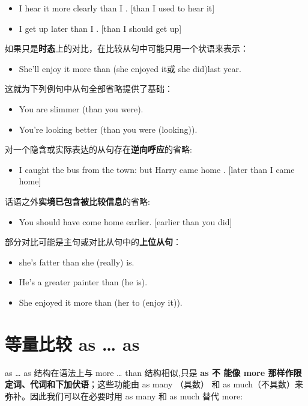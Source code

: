 \begin{itemize}
\item I hear it more clearly than I . [than I used to hear it]

\item I get up later than I . [than I should get up]
\end{itemize}

如果只是\textbf{时态}上的对比，在比较从句中可能只用一个状语来表示：
\begin{itemize}
\item She'll enjoy it more than (she enjoyed it或 she did)last year.
\end{itemize}
这就为下列例句中从句全部省略提供了基础：
\begin{itemize}
\item You are slimmer (than you were).
\item You're looking better (than you were (looking)).
\end{itemize}

对一个隐含或实际表达的从句存在\textbf{逆向呼应}的省略:
\begin{itemize}
\item I caught the bus from the town: but Harry came home . [later than I came home]
\end{itemize}


话语之外\textbf{实境已包含被比较信息}的省略:
\begin{itemize}
\item You should have come home earlier. [earlier than you did]
\end{itemize}

部分对比可能是主句或对比从句中的\textbf{上位从句}：
\begin{itemize}
\item {} she's fatter than she (really) is.
\item He's a greater painter than  (he is).
\item She enjoyed it more than  (her to (enjoy it)).
\end{itemize}

\section{等量比较 as \ldots{} as}

as \ldots{} as 结构在语法上与 more \ldots{} than 结构相似,只是 \textbf{as 不
  能像 more 那样作限定词、代词和下加伏语}；这些功能由 as many （具数） 和 as
much（不具数）来弥补。因此我们可以在必要时用 as many 和 as much 替代 more:

